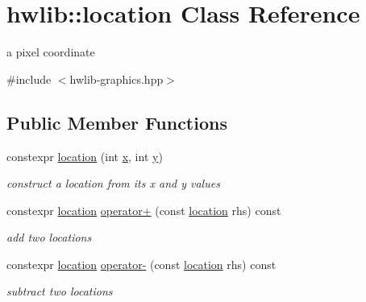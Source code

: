\hypertarget{classhwlib_1_1location}{}\section{hwlib\+:\+:location Class Reference}
\label{classhwlib_1_1location}


a pixel coordinate  




{\ttfamily \#include $<$hwlib-\/graphics.\+hpp$>$}

\subsection*{Public Member Functions}
\begin{DoxyCompactItemize}
\item 
constexpr \hyperlink{classhwlib_1_1location_a773fb161de3b4b556aa85f100a0d609c}{location} (int \hyperlink{classhwlib_1_1location_abe7c9cfa19fff1fc38c9d803d0b5ce75}{x}, int \hyperlink{classhwlib_1_1location_ae8f5e3edb0ae2ec336afc6efc09f3762}{y})\hypertarget{classhwlib_1_1location_a773fb161de3b4b556aa85f100a0d609c}{}\label{classhwlib_1_1location_a773fb161de3b4b556aa85f100a0d609c}

\begin{DoxyCompactList}\small\item\em construct a location from its x and y values \end{DoxyCompactList}\item 
constexpr \hyperlink{classhwlib_1_1location}{location} \hyperlink{classhwlib_1_1location_a930b1b76ab027f12e482be4a2fc9d8ae}{operator+} (const \hyperlink{classhwlib_1_1location}{location} rhs) const \hypertarget{classhwlib_1_1location_a930b1b76ab027f12e482be4a2fc9d8ae}{}\label{classhwlib_1_1location_a930b1b76ab027f12e482be4a2fc9d8ae}

\begin{DoxyCompactList}\small\item\em add two locations \end{DoxyCompactList}\item 
constexpr \hyperlink{classhwlib_1_1location}{location} \hyperlink{classhwlib_1_1location_a4090571a5f0c80fad4b1aa8e4939ad1c}{operator-\/} (const \hyperlink{classhwlib_1_1location}{location} rhs) const \hypertarget{classhwlib_1_1location_a4090571a5f0c80fad4b1aa8e4939ad1c}{}\label{classhwlib_1_1location_a4090571a5f0c80fad4b1aa8e4939ad1c}

\begin{DoxyCompactList}\small\item\em subtract two locations \end{DoxyCompactList}\end{DoxyCompactItemize}

